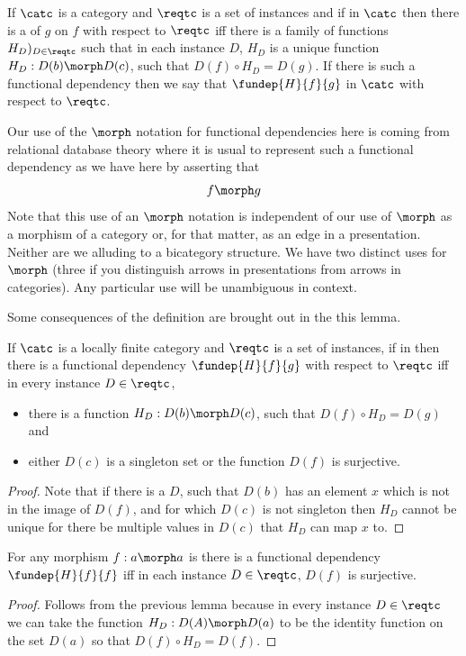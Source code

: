 \begin{definition}
If $\catc$ is a category and $\reqtc$ is a set of instances and if \fgsourcediag
in $\catc$ then there is a   of $g$ on $f$ with respect to $\reqtc$ iff
there is a family of functions $H_D)_{D \in \reqtc}$ such that 
in each instance $D$, $H_D$ is a unique function $H_D: D(b) \morph D(c)$, such that $D(f) \circ H_D = D(g)$. 
If there is such a functional dependency then we say that $\fundep{H}{f}{g}$ in $\catc$ with respect to $\reqtc$.
\end{definition}

Our use of the $\morph$ notation for functional dependencies here is coming from relational database theory where it is usual to represent such a functional dependency as we have here by asserting that 
$$
f \morph g
$$
Note that this use of an $\morph$ notation is independent of our use of $\morph$ as a morphism of a category 
or, for that matter, as an edge in a presentation. Neither are we alluding to a bicategory structure. We have two distinct uses for $\morph$ (three if you distinguish arrows in presentations from arrows in categories). Any particular use will be unambiguous in context.

Some consequences of the definition are brought out in the this lemma.
\begin{lemma}
If $\catc$ is a locally finite category and $\reqtc$ is a set of instances, 
if \fgsourcediag in \catcw
then there is a functional dependency $\fundep{H}{f}{g}$  with respect to $\reqtc$ 
iff in every instance $D \in \reqtc$, 
\begin{itemize}
\item
there is a  function $H_D: D(b) \morph D(c)$, 
such that $D(f) \circ H_D = D(g)$ and 
\item either $D(c)$ is a singleton set  or 
           the function $D(f)$ is surjective.
\end{itemize}
\end{lemma}
\begin{proof}
Note that if there is a $D$, such that $D(b)$ has
an element $x$ which is not in the image of $D(f)$, and for which $D(c)$ is not singleton
then $H_D$ cannot be unique for there be multiple values in $D(c)$ that $H_D$ can map $x$ to. 
\end{proof}
\begin{corollary}
For any morphism $f:a \morph a$ is \catcw there is a functional dependency $\fundep{H}{f}{f}$ iff
in each instance  $D \in \reqtc$, $D(f)$ is surjective.
\end{corollary}
\begin{proof}
Follows from the previous lemma because in every instance $D \in \reqtc$ 
we can take the function $H_D: D(A) \morph D(a)$ to be the identity function on the set $D(a)$
so that  $D(f) \circ H_D = D(f)$. 
\end{proof}

